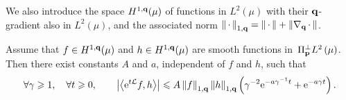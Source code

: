 \documentclass[11pt,a4paper]{article}
\begin{document}
We also introduce the space $H^{1,\boldsymbol{\mathbf q}}(\mu)$ of functions in $L^2(\mu)$ with their $\boldsymbol{\mathbf q}$-gradient also in $L^2(\mu)$,
and the associated norm $\norm{\dummy}[1,\vect q] = \norm{\dummy} + \norm{\grad_{\vect q} \dummy}$.
\begin{proposition}
    \label{proposition:semigroup_meanzero_observable}
    Assume that $f \in H^{1,\boldsymbol{\mathbf q}}(\mu)$ and $h \in H^{1,\boldsymbol{\mathbf q}}(\mu)$ are smooth functions in~$\Pi_{\vect p}^\perp \lp{2}{\mu}$.
    Then there exist constants $A$ and $a$, independent of $f$ and $h$, such that
    \begin{equation}
        \label{eq:optimal_decay_correlation}
        \forall \gamma \geq 1, \quad
        \forall t \geq 0, \qquad
        \abs{\ip{\e^{t \mathcal L}f}{h}}
        \leq A \norm{f}[1,\vect q]  \norm{h}[1,\vect q] \left( \gamma^{-2} \e^{- a \gamma^{-1} t} + \e^{- a \gamma t} \right).
    \end{equation}
\end{proposition}
\end{document}

